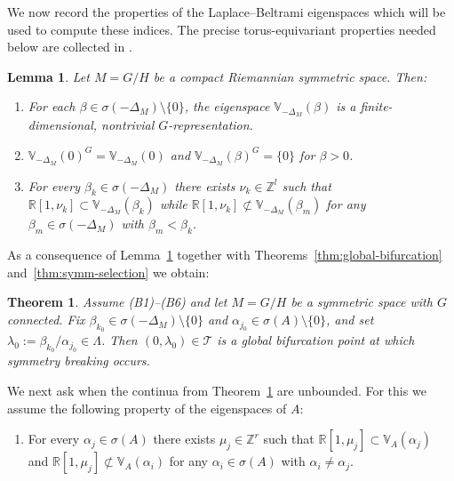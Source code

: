 \documentclass[reqno,twoside,12pt]{amsart}
\newtheorem{Lemma}[Remark]{Lemma}
\newtheorem{Theorem}[Remark]{Theorem}
\newcommand{\bR}{\mathbb{R}}
\newcommand{\bV}{\mathbb{V}}
\newcommand{\cT}{\mathcal{T}}
\numberwithin{equation}{section} \errorcontextlines=0
\begin{document}
We now record the properties of the Laplace--Beltrami eigenspaces which will be used
to compute these indices. The precise torus-equivariant properties needed below
are collected in \cite[Section~2.2]{Stefaniak2025}.

\begin{Lemma}\label{lem:eigenspaces-GH}
Let $M=G/H$ be a compact Riemannian symmetric space. Then:
\begin{enumerate}
\item For each $\beta\in\sigma(-\Delta_{M})\setminus\{0\}$, the eigenspace
$\bV_{-\Delta_{M}}(\beta)$ is a finite-dimensional, nontrivial $G$-representation.
\item $\bV_{-\Delta_{M}}(0)^G=\bV_{-\Delta_{M}}(0)$ and
$\bV_{-\Delta_{M}}(\beta)^G=\{0\}$ for $\beta>0$.
\item For every $\beta_k\in\sigma(-\Delta_M)$ there exists $\nu_k\in\mathbb{Z}^l$
such that $\bR[1,\nu_k]\subset\bV_{-\Delta_M}(\beta_k)$ while
$\bR[1,\nu_k]\not\subset\bV_{-\Delta_M}(\beta_m)$ for any
$\beta_m\in\sigma(-\Delta_M)$ with $\beta_m<\beta_k$.
\end{enumerate}
\end{Lemma}

As a consequence of Lemma~\ref{lem:eigenspaces-GH} together with
Theorems~\ref{thm:global-bifurcation} and~\ref{thm:symm-selection} we obtain:

\begin{Theorem}\label{thm:global-bifurcation-symmetric}
Assume \textnormal{(B1)}--\textnormal{(B6)} and let $M=G/H$ be a symmetric space with $G$ connected. Fix $\beta_{k_{0}}\in\sigma(-\Delta_{M})\setminus\{0\}$ and $\alpha_{j_{0}}\in\sigma(A)\setminus\{0\}$, and set $\lambda_{0}:=\beta_{k_{0}}/\alpha_{j_{0}}\in\Lambda$.
Then $(0,\lambda_{0})\in\cT$ is a global bifurcation point at which symmetry breaking occurs.
\end{Theorem}

We next ask when the continua from Theorem~\ref{thm:global-bifurcation-symmetric} are unbounded. For this we assume the following property of the eigenspaces of $A$:
\begin{enumerate}
\item[(E)] For every $\alpha_j\in\sigma(A)$ there exists $\mu_j\in\mathbb{Z}^r$ such that
$\bR[1,\mu_j]\subset\bV_A(\alpha_j)$ and
$\bR[1,\mu_j]\not\subset\bV_A(\alpha_i)$ for any $\alpha_i\in\sigma(A)$ with $\alpha_i\ne\alpha_j$.
\end{enumerate}
\end{document}
